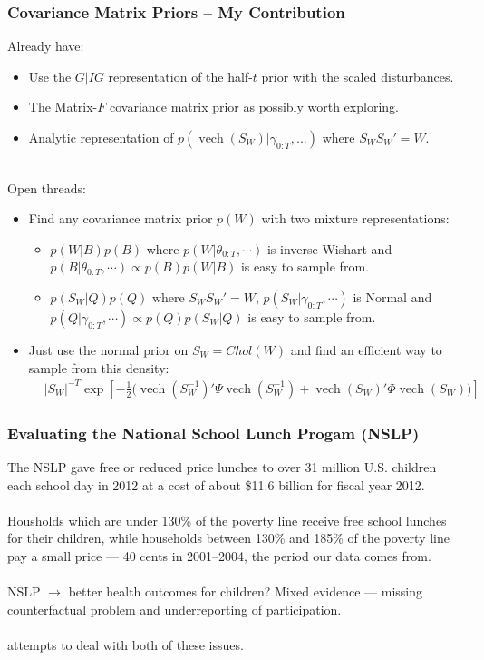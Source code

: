 \documentclass[xcolor=dvipsnames]{beamer}
\DeclareMathOperator{\vech}{vech}
\begin{document}
\begin{frame}
\frametitle{Covariance Matrix Priors -- My Contribution}
Already have:
\begin{itemize}
\item Use the $G|IG$ representation of the half-$t$ prior with the scaled disturbances.
\item The Matrix-$F$ covariance matrix prior as possibly worth exploring.
\item Analytic representation of $p(\vech(S_W)|\gamma_{0:T},...)$ where $S_WS_W'=W$.\\~\\
\end{itemize}
Open threads:
\begin{itemize}
\item Find any covariance matrix prior $p(W)$ with two mixture representations:
\begin{itemize}
\item $p(W|B)p(B)$ where $p(W|\theta_{0:T},\cdots)$ is inverse Wishart and $p(B|\theta_{0:T},\cdots)\propto p(B)p(W|B)$ is easy to sample from.
\item $p(S_W|Q)p(Q)$ where $S_WS_W'=W$, $p(S_W|\gamma_{0:T},\cdots)$ is Normal and $p(Q|\gamma_{0:T},\cdots)\propto p(Q)p(S_W|Q)$ is easy to sample from.
\end{itemize}
\item Just use the normal prior on $S_W=Chol(W)$ and find an efficient way to sample from this density:
\begin{align*}
&|S_W|^{-T}\exp\left[-\frac{1}{2}\bigg(\vech(S_W^{-1})'\Psi\vech(S_W^{-1}) + \vech(S_W)'\Phi\vech(S_W)  \bigg)\right]
\end{align*}

\end{itemize}
\end{frame}

\begin{frame}
  \frametitle{Evaluating the National School Lunch Progam (NSLP)}
The NSLP gave free or reduced price lunches to over 31 million U.S. children each school day in 2012 at a cost of about \$11.6 billion for fiscal year 2012.\\~\\

Housholds which are under 130\% of the poverty line receive free school lunches for their children, while households between 130\% and 185\% of the poverty line pay a small price --- 40 cents in 2001--2004, the period our data comes from.\\~\\

NSLP $\to$ better health outcomes for children? Mixed evidence --- missing counterfactual problem and underreporting of participation.\\~\\

\citet{gundersen2012impact} attempts to deal with both of these issues.\\~\\

\end{frame}
\end{document}
